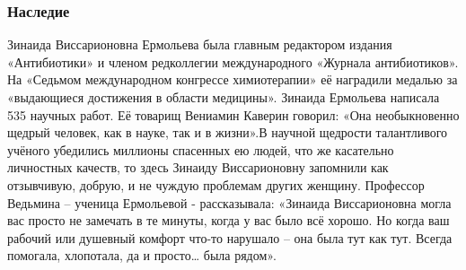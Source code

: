 \subsubsection{Наследие}

Зинаида Виссарионовна Ермольева была главным редактором издания «Антибиотики» и
членом редколлегии международного «Журнала антибиотиков». На «Седьмом
международном конгрессе химиотерапии» её наградили медалью за «выдающиеся
достижения в области медицины». Зинаида Ермольева написала 535 научных работ.
Её товарищ Вениамин Каверин говорил: «Она необыкновенно щедрый человек, как в
науке, так и в жизни».В научной щедрости талантливого учёного убедились
миллионы спасенных ею людей, что же касательно личностных качеств, то здесь
Зинаиду Виссарионовну запомнили как отзывчивую, добрую, и не чуждую проблемам
других женщину. Профессор Ведьмина – ученица Ермольевой - рассказывала:
«Зинаида Виссарионовна могла вас просто не замечать в те минуты, когда у вас
было всё хорошо. Но когда ваш рабочий или душевный комфорт что-то нарушало –
она была тут как тут. Всегда помогала, хлопотала, да и просто… была рядом».

